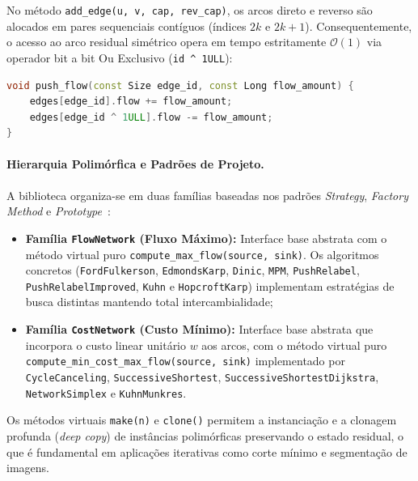 No método \lstinline{add_edge(u, v, cap, rev_cap)}, os arcos direto e reverso são alocados em pares sequenciais contíguos (índices $2k$ e $2k+1$). Consequentemente, o acesso ao arco residual simétrico opera em tempo estritamente $\mathcal{O}(1)$ via operador bit a bit Ou Exclusivo (\lstinline{id ^ 1ULL}):
\begin{lstlisting}[language=C++, numbers=none, basicstyle=\ttfamily\footnotesize, frame=none, backgroundcolor=\color{white}]
void push_flow(const Size edge_id, const Long flow_amount) {
    edges[edge_id].flow += flow_amount;
    edges[edge_id ^ 1ULL].flow -= flow_amount;
}
\end{lstlisting}

\paragraph{Hierarquia Polimórfica e Padrões de Projeto.}
A biblioteca organiza-se em duas famílias baseadas nos padrões \textit{Strategy}, \textit{Factory Method} e \textit{Prototype}~\cite{gamma1994design}:
\begin{itemize}
    \item \textbf{Família \lstinline{FlowNetwork} (Fluxo Máximo):} Interface base abstrata com o método virtual puro \lstinline{compute_max_flow(source, sink)}. Os algoritmos concretos (\lstinline{FordFulkerson}, \lstinline{EdmondsKarp}, \lstinline{Dinic}, \lstinline{MPM}, \lstinline{PushRelabel}, \lstinline{PushRelabelImproved}, \lstinline{Kuhn} e \lstinline{HopcroftKarp}) implementam estratégias de busca distintas mantendo total intercambialidade;
    \item \textbf{Família \lstinline{CostNetwork} (Custo Mínimo):} Interface base abstrata que incorpora o custo linear unitário $w$ aos arcos, com o método virtual puro \lstinline{compute_min_cost_max_flow(source, sink)} implementado por \lstinline{CycleCanceling}, \lstinline{SuccessiveShortest}, \lstinline{SuccessiveShortestDijkstra}, \lstinline{NetworkSimplex} e \lstinline{KuhnMunkres}.
\end{itemize}

Os métodos virtuais \lstinline{make(n)} e \lstinline{clone()} permitem a instanciação e a clonagem profunda (\textit{deep copy}) de instâncias polimórficas preservando o estado residual, o que é fundamental em aplicações iterativas como corte mínimo e segmentação de imagens.
